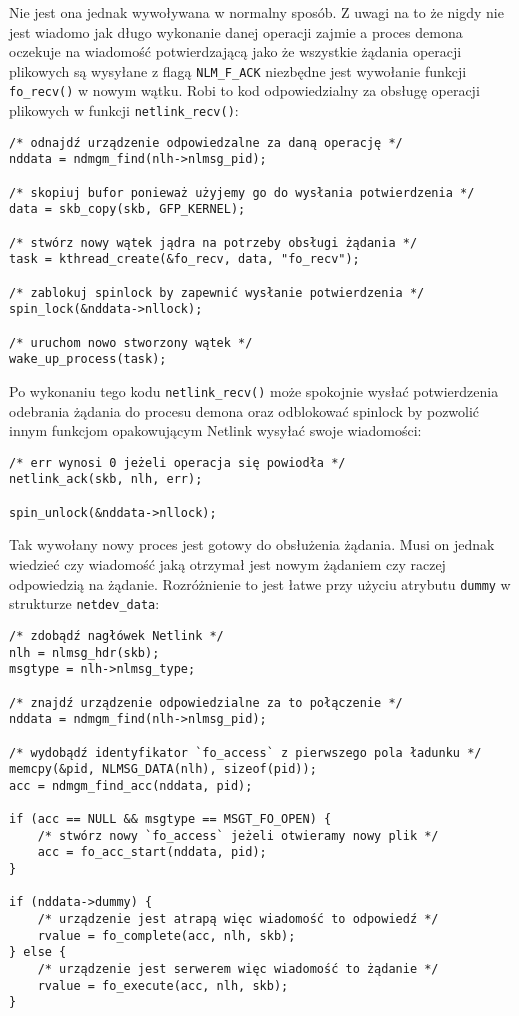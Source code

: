 Nie jest ona jednak wywoływana w normalny sposób. Z uwagi na to że nigdy
nie jest wiadomo jak długo wykonanie danej operacji zajmie a proces
demona oczekuje na wiadomość potwierdzającą jako że wszystkie żądania
operacji plikowych są wysyłane z flagą \texttt{NLM\_F\_ACK} niezbędne
jest wywołanie funkcji \texttt{fo\_recv()} w nowym wątku. Robi to kod
odpowiedzialny za obsługę operacji plikowych w funkcji
\texttt{netlink\_recv()}:

\begin{verbatim}
/* odnajdź urządzenie odpowiedzalne za daną operację */
nddata = ndmgm_find(nlh->nlmsg_pid);

/* skopiuj bufor ponieważ użyjemy go do wysłania potwierdzenia */
data = skb_copy(skb, GFP_KERNEL);

/* stwórz nowy wątek jądra na potrzeby obsługi żądania */
task = kthread_create(&fo_recv, data, "fo_recv");

/* zablokuj spinlock by zapewnić wysłanie potwierdzenia */
spin_lock(&nddata->nllock);

/* uruchom nowo stworzony wątek */
wake_up_process(task);
\end{verbatim}

Po wykonaniu tego kodu \texttt{netlink\_recv()} może spokojnie wysłać
potwierdzenia odebrania żądania do procesu demona oraz odblokować
spinlock by pozwolić innym funkcjom opakowującym Netlink wysyłać swoje
wiadomości:

\begin{verbatim}
/* err wynosi 0 jeżeli operacja się powiodła */
netlink_ack(skb, nlh, err);

spin_unlock(&nddata->nllock);
\end{verbatim}

Tak wywołany nowy proces jest gotowy do obsłużenia żądania. Musi on
jednak wiedzieć czy wiadomość jaką otrzymał jest nowym żądaniem czy
raczej odpowiedzią na żądanie. Rozróżnienie to jest łatwe przy użyciu
atrybutu \texttt{dummy} w strukturze \texttt{netdev\_data}:

\begin{verbatim}
/* zdobądź nagłówek Netlink */
nlh = nlmsg_hdr(skb);
msgtype = nlh->nlmsg_type;

/* znajdź urządzenie odpowiedzialne za to połączenie */
nddata = ndmgm_find(nlh->nlmsg_pid);

/* wydobądź identyfikator `fo_access` z pierwszego pola ładunku */
memcpy(&pid, NLMSG_DATA(nlh), sizeof(pid));
acc = ndmgm_find_acc(nddata, pid);

if (acc == NULL && msgtype == MSGT_FO_OPEN) {
    /* stwórz nowy `fo_access` jeżeli otwieramy nowy plik */
    acc = fo_acc_start(nddata, pid);
}

if (nddata->dummy) {
    /* urządzenie jest atrapą więc wiadomość to odpowiedź */
    rvalue = fo_complete(acc, nlh, skb);
} else {
    /* urządzenie jest serwerem więc wiadomość to żądanie */
    rvalue = fo_execute(acc, nlh, skb);
}
\end{verbatim}

